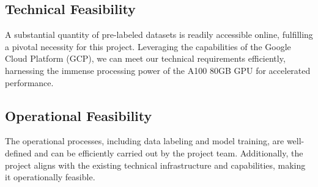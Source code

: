     \subsection{Technical Feasibility}
        A substantial quantity of pre-labeled datasets is readily accessible online, fulfilling a pivotal necessity for this project. Leveraging the capabilities of the Google Cloud Platform (GCP), we can meet our technical requirements efficiently, harnessing the immense processing power of the A100 80GB GPU for accelerated performance.

    \subsection{Operational Feasibility}
        The operational processes, including data labeling and model training, are well-defined and can be efficiently carried out by the project team. Additionally, the project aligns with the existing technical infrastructure and capabilities, making it operationally feasible.